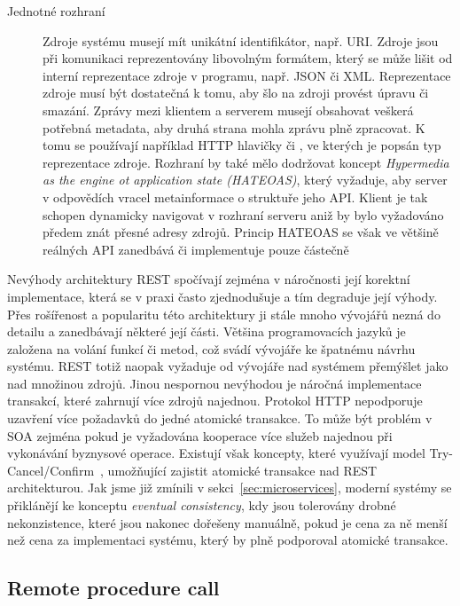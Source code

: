 \begin{description}
    \item [Jednotné rozhraní] Zdroje systému musejí mít unikátní identifikátor, např. \gls{URI}. Zdroje jsou při komunikaci reprezentovány libovolným formátem, který
    se může lišit od interní reprezentace zdroje v programu, např. \gls{JSON} či \gls{XML}. Reprezentace zdroje musí být
    dostatečná k tomu, aby šlo na zdroji provést úpravu či smazání. Zprávy mezi klientem a serverem musejí obsahovat veškerá potřebná metadata,
    aby druhá strana mohla zprávu plně zpracovat. K tomu se používají například \gls{HTTP} hlavičky 
    či , ve kterých je popsán typ reprezentace zdroje.
    Rozhraní by také mělo dodržovat koncept \textit{Hypermedia as the engine ot application state (\gls{HATEOAS})},
    který vyžaduje, aby server v odpovědích vracel metainformace o struktuře jeho \gls{API}.
    Klient je tak schopen dynamicky navigovat v rozhraní serveru aniž by bylo vyžadováno předem znát přesné adresy zdrojů.
    Princip \gls{HATEOAS} se však ve většině reálných \gls{API} zanedbává či implementuje pouze částečně
\end{description}

Nevýhody architektury \gls{REST} spočívají zejména v náročnosti její korektní implementace,
která se v praxi často zjednodušuje a tím degraduje její výhody. Přes rošířenost a popularitu
této architektury ji stále mnoho vývojářů nezná do detailu a zanedbávají některé její části.
Většina programovacích jazyků je založena na volání funkcí či metod, což svádí vývojáře ke
špatnému návrhu systému. \gls{REST} totiž naopak vyžaduje od vývojáře nad systémem přemýšlet jako
nad množinou zdrojů. Jinou nespornou nevýhodou je náročná implementace transakcí, které zahrnují více
zdrojů najednou. Protokol \gls{HTTP} nepodporuje uzavření více požadavků do jedné atomické
transakce. To může být problém v \gls{SOA} zejména pokud je vyžadována kooperace více služeb
najednou při vykonávání byznysové operace. Existují však koncepty, které využívají model
Try-Cancel/Confirm~\cite{pardon2011towards}, umožňující zajistit atomické transakce nad \gls{REST} architekturou.
Jak jsme již zmínili v sekci~\ref{sec:microservices}, moderní systémy se přiklánějí ke konceptu
\textit{eventual consistency}, kdy jsou tolerovány drobné nekonzistence, které jsou nakonec
dořešeny manuálně, pokud je cena za ně menší než cena za implementaci systému, který
by plně podporoval atomické transakce.

\subsection{Remote procedure call}\label{sec:rpc}


